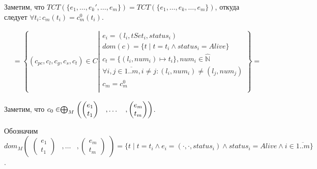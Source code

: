 Заметим, что $TCT(\{e_1, \dots, e_k', \dots, e_m\}) = TCT(\{e_1, \dots, e_k, \dots, e_m\})$, откуда следует $\forall t_i: c_m(t_i) = c^0_m(t_i)$.

\begin{align}
& = \left\lbrace (c_{pc},c_l,c_g,c_s, c_t) \in C 
\left| 
\begin{array}{c}
e_i = (l_i, tSet_i, status_i) \\
dom(c) = \{t \mid t = t_i \land status_i = Alive\}\\
c_t = \{(l_i, num_i) \mapsto t_i\}, num_i \in \widehat{\mathbb{N}} \\
\forall i, j \in \overline{1..m}, i \neq j: (l_i, num_i) \neq (l_j, num_j)\\
c_m = c^0_m \\
\end{array}
\right.
\right\rbrace = \nonumber
\end{align}

Заметим, что $c_0 \in \mathrel{\bigoplus}_M
\begin{pmatrix}
\begin{pmatrix}
e_1 \\
t_1 
\end{pmatrix}& ,
\dots& ,
\begin{pmatrix}
e_m \\
t_m 
\end{pmatrix}
\end{pmatrix}$.

Обозначим $dom_M\begin{pmatrix}
\begin{pmatrix}
e_1 \\
t_1 
\end{pmatrix}& ,
\dots& ,
\begin{pmatrix}
e_m \\
t_m 
\end{pmatrix}
\end{pmatrix} = \{t \mid t = t_i \land e_i=(\cdot, \cdot, status_i) \land status_i = Alive \land i \in \overline{1..m}\}$.

